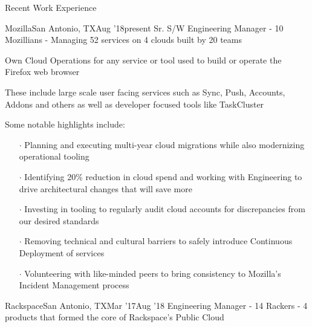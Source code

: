 \documentclass{resume} %
\begin{document}
\begin{rSection}{Recent Work Experience}


\begin{rSubsection}{Mozilla}{San Antonio, TX}{Aug '18}{present}
{Sr. S/W Engineering Manager - 10 Mozillians - Managing 52 services on 4 clouds built by 20 teams}
  
\item Own Cloud Operations for any service or tool used to build or operate the Firefox web browser
\item These include large scale user facing services such as Sync, Push, Accounts, Addons and others as well as developer focused tools like TaskCluster 
\item Some notable highlights include:
  \vspace{-0.5em}
  \begin{itemize}  \itemsep0.5pt \parskip0pt
    \item[$\cdot$] Planning and executing multi-year cloud migrations while also modernizing operational tooling
    \item[$\cdot$] Identifying 20\% reduction in cloud spend and working with Engineering to drive architectural changes that will save more
    \item[$\cdot$] Investing in tooling to regularly audit cloud accounts for discrepancies from our desired standards
    \item[$\cdot$] Removing technical and cultural barriers to safely introduce Continuous Deployment of services
    \item[$\cdot$] Volunteering with like-minded peers to bring consistency to Mozilla's Incident Management process
\end{itemize}
  
\end{rSubsection}


\begin{rSubsection}{Rackspace}{San Antonio, TX}{Mar '17}{Aug '18}
{Engineering Manager - 14 Rackers - 4 products that formed the core of Rackspace's Public Cloud}
  

\end{rSubsection}
\end{rSection}
\end{document}
